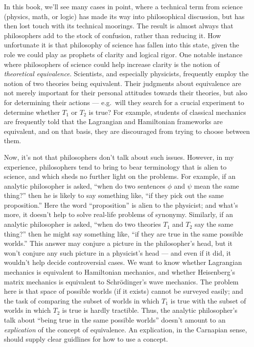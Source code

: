 In this book, we'll see many cases in point, where a technical term
from science (physics, math, or logic) has made its way into
philosophical discussion, but has then lost touch with its technical
moorings.  The result is almost always that philosophers add to the
stock of confusion, rather than reducing it.  How unfortunate it is
that philosophy of science has fallen into this state, given the role
we could play as prophets of clarity and logical rigor.  One notable
instance where philosophers of science could help increase clarity is
the notion of {\it theoretical equivalence}.  Scientists, and
especially physicists, frequently employ the notion of two theories
being equivalent.  Their judgments about equivalence are not merely
important for their personal attitudes towards their theories, but
also for determining their actions --- e.g.\ will they search for a
crucial experiment to determine whether $T_1$ or $T_2$ is true?  For
example, students of classical mechanics are frequently told that the
Lagrangian and Hamiltonian frameworks are equivalent, and on that
basis, they are discouraged from trying to choose between them.

Now, it's not that philosophers don't talk about such issues.
However, in my experience, philosophers tend to bring to bear
terminology that is alien to science, and which sheds no further light
on the problems.  For example, if an analytic philosopher is asked,
``when do two sentences $\phi$ and $\psi$ mean the same thing?'' then
he is likely to say something like, ``if they pick out the same
proposition.''  Here the word ``proposition'' is alien to the
physicist; and what's more, it doesn't help to solve real-life
problems of synonymy.  Similarly, if an analytic philosopher is asked,
``when do two theories $T_1$ and $T_2$ say the same thing?''  then he
might say something like, ``if they are true in the same possible
worlds.''  This answer may conjure a picture in the philosopher's
head, but it won't conjure any such picture in a physicist's head ---
and even if it did, it wouldn't help decide controversial cases.  We
want to know whether Lagrangian mechanics is equivalent to Hamiltonian
mechanics, and whether Heisenberg's matrix mechanics is equivalent to
Schr\"odinger's wave mechanics.  The problem here is that space of
possible worlds (if it exists) cannot be surveyed easily; and the task
of comparing the subset of worlds in which $T_1$ is true with the
subset of worlds in which $T_2$ is true is hardly tractible.  Thus,
the analytic philosopher's talk about ``being true in the same
possible worlds'' doesn't amount to an {\it explication} of the
concept of equivalence.  An explication, in the Carnapian sense,
should supply clear guidlines for how to use a concept.

